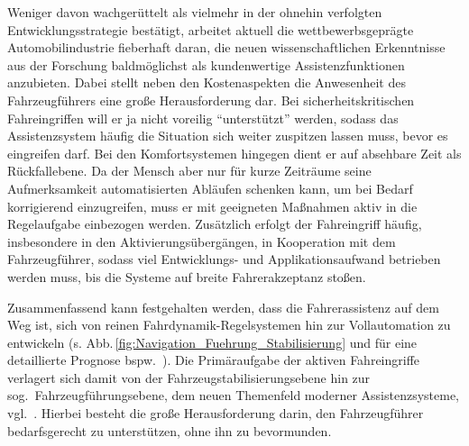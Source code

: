 Weniger davon wachgerüttelt als vielmehr in der ohnehin verfolgten Entwicklungsstrategie bestätigt, arbeitet aktuell die wettbewerbsgeprägte Automobilindustrie fieberhaft daran, die neuen wissenschaftlichen Erkenntnisse aus der Forschung baldmöglichst als kundenwertige Assistenzfunktionen anzubieten. Dabei stellt neben den Kostenaspekten die Anwesenheit des Fahrzeugführers eine große Herausforderung dar. Bei sicherheitskritischen Fahreingriffen will er ja nicht voreilig "`unterstützt"' werden, sodass das Assistenzsystem häufig die Situation sich weiter zuspitzen lassen muss, bevor es eingreifen darf.
Bei den Komfortsystemen hingegen %
dient er auf absehbare Zeit als Rückfallebene. Da der Mensch aber nur für kurze Zeiträume seine Aufmerksamkeit automatisierten Abläufen schenken kann, um bei Bedarf korrigierend einzugreifen, muss er mit geeigneten Maßnahmen aktiv in die Regelaufgabe einbezogen werden. 
Zusätzlich erfolgt der Fahreingriff häufig, insbesondere in den Aktivierungsübergängen, in Kooperation mit dem Fahrzeugführer, 
sodass viel Entwicklungs- und Applikationsaufwand betrieben werden muss, bis die Systeme auf breite Fahrerakzeptanz stoßen.


Zusammenfassend kann festgehalten werden, dass die Fahrerassistenz auf dem Weg ist, sich von reinen Fahrdynamik-Regelsystemen hin zur Vollautomation zu entwickeln (s. Abb.\,\ref{fig:Navigation_Fuehrung_Stabilisierung} und für eine detaillierte Prognose bspw.\ \cite{handbookIV_vanArem2012}). Die Primäraufgabe der aktiven Fahreingriffe verlagert sich damit von der Fahrzeugstabilisierungsebene hin zur sog.\ Fahrzeugführungsebene, dem neuen Themenfeld moderner Assistenzsysteme, vgl.\ \cite{handbuchFAS_Donges2012}. Hierbei besteht die große Herausforderung darin, den Fahrzeugführer bedarfsgerecht zu unterstützen, ohne ihn zu bevormunden.

